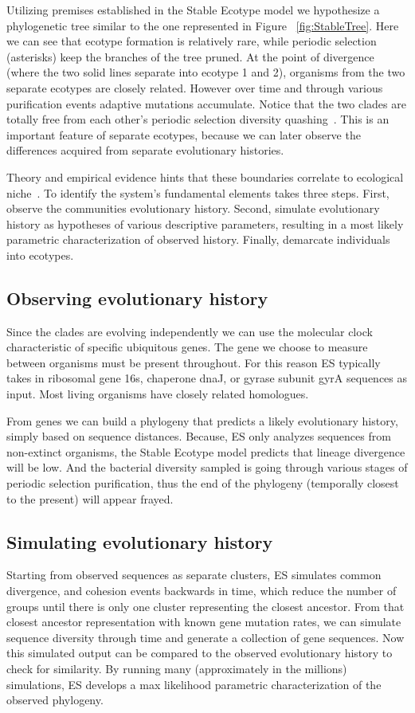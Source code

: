 Utilizing premises established in the Stable Ecotype model we hypothesize a phylogenetic tree similar to the one represented in Figure ~\ref{fig:StableTree}.
Here we can see that ecotype formation is relatively rare, while periodic selection (asterisks) keep the branches of the tree pruned.
At the point of divergence (where the two solid lines separate into ecotype 1 and 2), organisms from the two separate ecotypes are closely related.
However over time and through various purification events adaptive mutations accumulate.
Notice that the two clades are totally free from each other's periodic selection diversity quashing~\cite{cohan2007systematics}.
This is an important feature of separate ecotypes, because we can later observe the differences acquired from separate evolutionary histories.

Theory and empirical evidence hints that these boundaries correlate to ecological niche~\cite{cohan2007systematics, cohan2006sequence, ward2006cyanobacterial, cohan2006toward}.
To identify the system's fundamental elements takes three steps.
First, observe the communities evolutionary history.
Second, simulate evolutionary history as hypotheses of various descriptive parameters, resulting in a most likely parametric characterization of observed history.
Finally, demarcate individuals into ecotypes.

\subsection*{Observing evolutionary history}
Since the clades are evolving independently we can use the molecular clock characteristic of specific ubiquitous genes.
The gene we choose to measure between organisms must be present throughout.
For this reason ES typically takes in ribosomal gene 16s, chaperone dnaJ, or gyrase subunit gyrA sequences  as input. Most living organisms have closely related homologues.

From genes we can build a phylogeny that predicts a likely evolutionary history, simply based on sequence distances.
Because, ES only analyzes sequences from non-extinct organisms, the Stable Ecotype model predicts that lineage divergence will be low.
And the bacterial diversity sampled is going through various stages of periodic selection purification, thus the end of the phylogeny (temporally closest to the present) will appear frayed.

\subsection*{Simulating evolutionary history}
Starting from observed sequences as separate clusters, ES simulates common divergence, and cohesion events backwards in time, which reduce the number of groups until there is only one cluster representing the closest ancestor.
From that closest ancestor representation with known gene mutation rates, we can simulate sequence diversity through time and generate a collection of gene sequences.
Now this simulated output can be compared to the observed evolutionary history to check for similarity.
By running many (approximately in the millions) simulations, ES develops a max likelihood parametric characterization of the observed phylogeny. 

